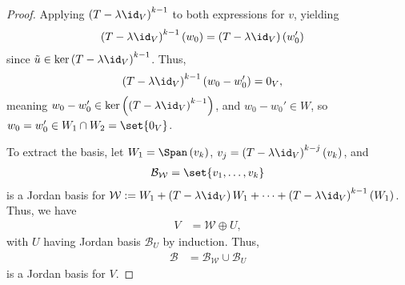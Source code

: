 \documentclass[10pt]{mypackage}
\begin{document}
\begin{proof}
  Applying $\left(T-\lambda\id_V\right)^{k-1}$ to both expressions for $v$, yielding
  \begin{align*}
    \left(T-\lambda\id_V\right)^{k-1}\left(w_0\right) &= \left(T-\lambda\id_V\right)\left(w_0'\right)
  \end{align*}
  since $\tilde{u}\in \ker\left(T-\lambda\id_V\right)^{k-1}$. Thus,
  \begin{align*}
    \left(T-\lambda\id_V\right)^{k-1}\left(w_0-w_0'\right) &= 0_V,
  \end{align*}
  meaning $w_0 - w_0'\in \ker\left(\left(T-\lambda\id_V\right)^{k-1}\right)$, and $w_0 - w_0'\in W$, so $w_0 = w_0'\in W_1\cap W_2 = \set{0_V}$.\newline

  To extract the basis, let $W_1 = \Span\left(v_k\right)$, $v_j = \left(T-\lambda\id_V\right)^{k-j}\left(v_k\right)$, and
  \begin{align*}
    \mathcal{B}_{\mathcal{W}} = \set{v_1,\dots,v_k}
  \end{align*}
  is a Jordan basis for $\mathcal{W} :=W_1 + \left(T-\lambda\id_V\right)W_1 + \cdots + \left(T-\lambda\id_V\right)^{k-1}\left(W_1\right)$. Thus, we have
  \begin{align*}
    V &= \mathcal{W}\oplus U,
  \end{align*}
  with $U$ having Jordan basis $\mathcal{B}_U$ by induction. Thus,
  \begin{align*}
    \mathcal{B} &= \mathcal{B}_{\mathcal{W}}\cup \mathcal{B}_U
  \end{align*}
  is a Jordan basis for $V$.
\end{proof}
\end{document}
